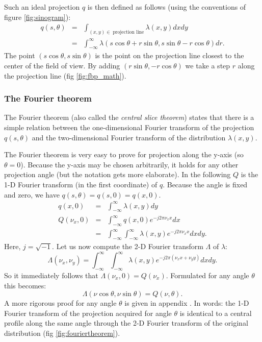 Such an ideal projection $q$ is then defined as follows (using the conventions
of figure \ref{fig:sinogram}):
\begin{eqnarray}
q(s, \theta) & = &\int_{(x,y) \in \; \mbox{projection line}}
                  \lambda(x,y) dx dy\\
             & = &\int_{-\infty}^{\infty}
        \lambda(s \cos \theta + r \sin \theta,
                s \sin \theta - r \cos \theta) dr. \label{eq:jnidealproj}
\end{eqnarray}
The point $(s \cos \theta, s \sin \theta)$ is the point on the projection line
closest to the center of the field of view.  By adding $(r \sin \theta, - r
\cos \theta)$ we take a step $r$ along the projection line (fig
\ref{fig:fbp_math}).


\subsubsection{The Fourier theorem}
The Fourier theorem (also called the {\em central slice theorem})
states that there is a simple relation between the one-dimensional
Fourier transform of the projection $q(s, \theta)$ and the
two-dimensional Fourier transform of the distribution $\lambda(x,y)$.

The Fourier theorem is very easy to prove for projection along the y-axis (so
$\theta = 0$). Because the y-axis may be chosen arbitrarily, it holds for
any other projection angle (but the notation gets more elaborate).
In the following $Q$ is the 1-D Fourier transform (in the first coordinate) of
$q$. Because the angle is fixed and zero, we have
$q(s, \theta) = q(s, 0) = q(x,0)$.
\begin{eqnarray}
  q(x,0) & = & \int_{-\infty}^{\infty} \lambda(x,y) dy \\
  Q(\nu_x,0) & = & \int_{-\infty}^{\infty}  q(x,0) e^{-j2\pi \nu_x x} dx \\
          & = & \int_{-\infty}^{\infty}  \int_{-\infty}^{\infty}
                 \lambda(x,y) e^{-j2\pi \nu_x x} dx dy.
\end{eqnarray}
Here, $j = \sqrt{-1}$. Let us now compute the 2-D Fourier transform
$\Lambda$ of $\lambda$:
\begin{equation}
\Lambda(\nu_x, \nu_y)  =   \int_{-\infty}^{\infty}  \int_{-\infty}^{\infty}
         \lambda(x,y) e^{-j2\pi (\nu_x x + \nu_y y)} dx dy.
\end{equation}
So it immediately follows that $\Lambda(\nu_x, 0) = Q(\nu_x)$.
Formulated for any angle $\theta$ this becomes:
\begin{equation}
  \Lambda(\nu \cos \theta, \nu \sin \theta) = Q(\nu, \theta). 
  \label{fouriertheorem}
\end{equation}
A more rigorous proof for any angle $\theta$ is given in appendix
.  In words: the 1-D Fourier transform of the projection
acquired for angle $\theta$ is identical to a central profile along
the same angle through the 2-D Fourier transform of the original
distribution (fig \ref{fig:fouriertheorem}).

